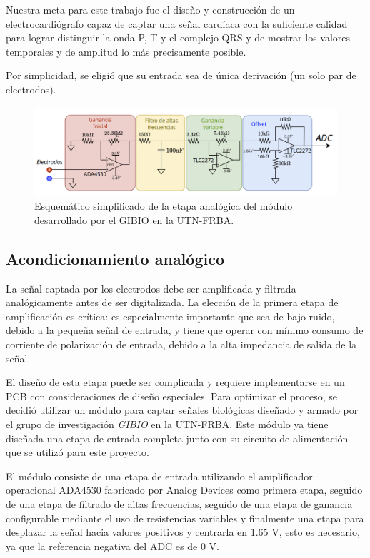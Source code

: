 \documentclass[conference]{IEEEtran}
\begin{document}
Nuestra meta para este trabajo fue el diseño y construcción de un electrocardiógrafo
capaz de captar una señal cardíaca con la suficiente calidad para lograr distinguir
la onda P, T y el complejo QRS y de mostrar los valores temporales y de amplitud
lo más precisamente posible.

Por simplicidad, se eligió que su entrada sea de única derivación (un solo par de
electrodos).
\begin{figure}[b]
    \centering
    \includegraphics[width=\textwidth]{figs/etapa_analogica.png}
    \caption{Esquemático simplificado de la etapa analógica del módulo desarrollado 
    por el GIBIO en la UTN-FRBA.}
    \label{fig:etapa_analogica_esquematico}
  \end{figure}
\subsection{Acondicionamiento analógico}




La señal captada por los electrodos debe ser amplificada y filtrada analógicamente
antes de ser digitalizada. La elección de la primera etapa de amplificación es
crítica: es especialmente importante que sea de bajo ruido, debido a la pequeña
señal de entrada, y tiene que operar con mínimo consumo de corriente de polarización
de entrada, debido a la alta impedancia de salida de la señal.

El diseño de esta etapa puede ser complicada y requiere implementarse en un PCB 
con consideraciones de diseño especiales. Para optimizar el proceso, se decidió utilizar un módulo para captar señales biológicas diseñado y armado por el grupo
de investigación \textit{GIBIO} en la UTN-FRBA. Este módulo ya tiene diseñada una
etapa de entrada completa junto con su circuito de alimentación que se utilizó para este 
proyecto.

El módulo consiste de una etapa de entrada utilizando el amplificador operacional
ADA4530 fabricado por Analog Devices \cite{ada4530} como primera etapa, seguido de una
etapa de filtrado de altas frecuencias, seguido de una etapa de ganancia configurable
mediante el uso de resistencias variables y finalmente una etapa para desplazar la señal
hacia valores positivos y centrarla en 1.65 V, esto es necesario, ya que la referencia
negativa del ADC es de 0 V.
\end{document}
